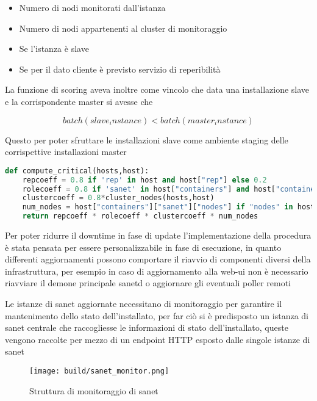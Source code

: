 \begin{itemize}
  \item{Numero di nodi monitorati dall'istanza}
  \item{Numero di nodi appartenenti al cluster di monitoraggio}
  \item{Se l'istanza è slave}
  \item{Se per il dato cliente è previsto servizio di reperibilità}
\end{itemize}

\newpage
La funzione di scoring aveva inoltre come vincolo che data una installazione slave e la corrispondente master si avesse che

\begin{equation}
  batch(slave_instance) < batch(master_instance)
\end{equation}

Questo per poter sfruttare le installazioni slave come ambiente staging delle corrispettive installazioni master

\begin{lstlisting}[language=python]
def compute_critical(hosts,host):
    repcoeff = 0.8 if 'rep' in host and host["rep"] else 0.2
    rolecoeff = 0.8 if 'sanet' in host["containers"] and host["containers"]["sanet"]["role"] == "prod" else 0.2
    clustercoeff = 0.8*cluster_nodes(hosts,host)
    num_nodes = host["containers"]["sanet"]["nodes"] if "nodes" in host["containers"]["sanet"] else 1
    return repcoeff * rolecoeff * clustercoeff * num_nodes
\end{lstlisting}

Per poter ridurre il downtime in fase di update l'implementazione della procedura è stata pensata per essere personalizzabile in fase di esecuzione, in quanto differenti aggiornamenti possono comportare il riavvio di componenti diversi della infrastruttura, per esempio in caso di aggiornamento alla web-ui non è necessario riavviare il demone principale sanetd o aggiornare gli eventuali poller remoti

Le istanze di sanet aggiornate necessitano di monitoraggio per garantire il mantenimento dello stato dell'installato, per far ciò si è predisposto un istanza di sanet centrale che raccogliesse le informazioni di stato dell'installato, queste vengono raccolte per mezzo di un endpoint HTTP esposto dalle singole istanze di sanet

\begin{figure}[H]
    \centering
    \texttt{[image: build/sanet\_monitor.png]}
    \caption{Struttura di monitoraggio di sanet}
    \label{fig:sanet_monitor}
\end{figure}

